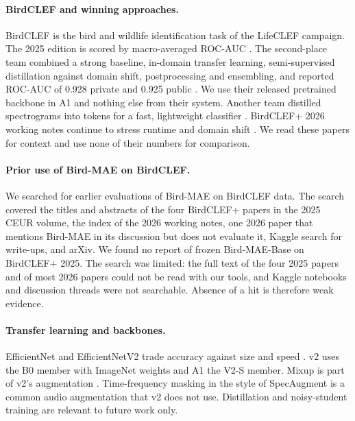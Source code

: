 \documentclass[letterpaper]{article} %
\begin{document}
\paragraph{BirdCLEF and winning approaches.}
BirdCLEF is the bird and wildlife identification task of the LifeCLEF campaign. The 2025 edition is scored by macro-averaged ROC-AUC \citep{canas2025birdclef}. The second-place team combined a strong baseline, in-domain transfer learning, semi-supervised distillation against domain shift, postprocessing and ensembling, and reported ROC-AUC of 0.928 private and 0.925 public \citep{sydorskyi2025tackling}. We use their released pretrained backbone in A1 and nothing else from their system. Another team distilled spectrograms into tokens for a fast, lightweight classifier \citep{miyaguchi2025distilling}. BirdCLEF+ 2026 working notes continue to stress runtime and domain shift \citep{banthia2026pantanal,chen2026class}. We read these papers for context and use none of their numbers for comparison.

\paragraph{Prior use of Bird-MAE on BirdCLEF.}
We searched for earlier evaluations of Bird-MAE on BirdCLEF data. The search covered the titles and abstracts of the four BirdCLEF+ papers in the 2025 CEUR volume, the index of the 2026 working notes, one 2026 paper that mentions Bird-MAE in its discussion but does not evaluate it, Kaggle search for write-ups, and arXiv. We found no report of frozen Bird-MAE-Base on BirdCLEF+ 2025. The search was limited: the full text of the four 2025 papers and of most 2026 papers could not be read with our tools, and Kaggle notebooks and discussion threads were not searchable. Absence of a hit is therefore weak evidence.

\paragraph{Transfer learning and backbones.}
EfficientNet and EfficientNetV2 trade accuracy against size and speed \citep{tan2019efficientnet,tan2021efficientnetv2}. v2 uses the B0 member with ImageNet weights and A1 the V2-S member. Mixup is part of v2's augmentation \citep{zhang2018mixup}. Time-frequency masking in the style of SpecAugment is a common audio augmentation \citep{park2019specaugment} that v2 does not use. Distillation and noisy-student training \citep{hinton2015distilling,xie2020selftraining} are relevant to future work only.
\end{document}
